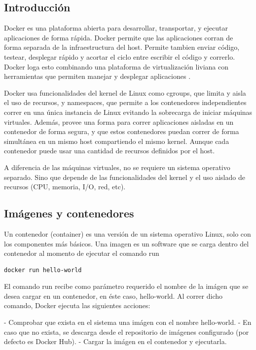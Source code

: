 \subsection[Introducción]{Introducción}

Docker es una plataforma abierta para desarrollar, transportar, y ejecutar aplicaciones de forma rápida. Docker permite que las aplicaciones corran de forma separada de la infraestructura del host. Permite tambien enviar código, testear, desplegar rápido y acortar el ciclo entre escribir el código y correrlo. Docker loga esto combinando una plataforma de virtualización liviana con herramientas que permiten manejar y desplegar aplicaciones \cite{Dj}.

Docker usa funcionalidades del kernel de Linux como cgroups, que limita y aisla el uso de recursos, y namespaces, que permite a los contenedores independientes correr en una única instancia de Linux evitando la sobrecarga de iniciar máquinas virtuales.
Además, provee una forma para correr aplicaciones aisladas en un contenedor de forma segura, y que estos contenedores puedan correr de forma simultánea en un mismo host compartiendo el mismo kernel. Aunque cada contenedor puede usar una cantidad de recursos definidos por el host.

A diferencia de las máquinas virtuales, no se requiere un sistema operativo separado. Sino que depende de las funcionalidades del kernel y el uso aislado de recursos (CPU, memoria, I/O, red, etc).

\subsection[Imágenes y contenedores]{Imágenes y contenedores}

Un contenedor (container) es una versión de un sistema operativo Linux, solo con los componentes más básicos. Una imagen es un software que se carga dentro del contenedor al momento de ejecutar el comando run

\begin{lstlisting}[language=bash]
    docker run hello-world
\end{lstlisting}


El comando run recibe como parámetro requerido el nombre de la imágen que se desea cargar en un contenedor, en éste caso, hello-world.
Al correr dicho comando, Docker ejecuta las siguientes acciones:

- Comprobar que exista en el sistema una imágen con el nombre hello-world.
- En caso que no exista, se descarga desde el repositorio de imágenes configurado (por defecto es Docker Hub).
- Cargar la imágen en el contenedor y ejecutarla.

